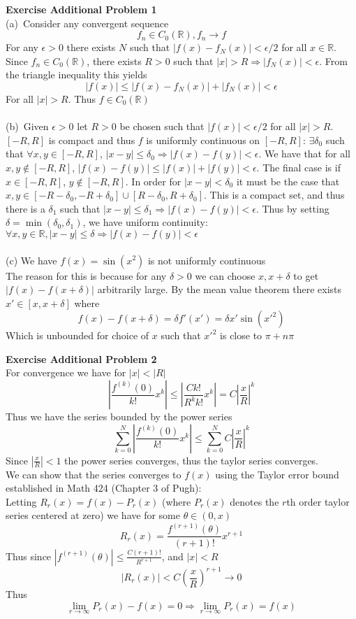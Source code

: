 \documentclass[12pt]{article}
\newenvironment{ques}[1]{\textbf{Exercise #1}\vspace{1 mm}\\ }{\bigskip}
\theoremstyle{definition}
\renewcommand{\l}{\left }
\renewcommand{\r}{\right }
\newcommand{\R}{\mathbb R}
\renewcommand{\t}{\theta}
\begin{document}
\begin{ques}{Additional Problem 1}
	(a)\ Consider any convergent sequence 
	$$f_n \in C_0(\R), f_n \to f$$
	For any $\epsilon > 0$ there exists $N$ such that $|f(x) - f_N(x)| <
	\epsilon / 2$ for all $x \in \R$. Since $f_n \in C_0(\R)$, there exists $R
	> 0$ such that $|x| > R \Rightarrow |f_N(x)| < \epsilon$. From the triangle
	inequality this yields
	$$|f(x)| \leq |f(x) - f_N(x)| + |f_N(x)| < \epsilon$$
	For all $|x| > R$. Thus $f \in C_0(\R)$\\
	\\
	(b)\ Given $\epsilon > 0$ let $R > 0$ be chosen such that $|f(x)| <
	\epsilon/2$ for all $|x| > R$. $[-R, R]$ is compact and thus $f$ is uniformly
	continuous on $[-R,R]$: $\exists \delta_0$ such that $\forall x,y \in
	[-R,R]$, $|x-y| \leq \delta_0 \Rightarrow |f(x) - f(y)| < \epsilon$. We have
	that for all $x,y \notin [-R,R]$, $|f(x) - f(y)| \leq |f(x)| + |f(y)| <
	\epsilon$. The final case is if $x \in [-R,R]$, $y \notin [-R,R]$. In order
	for $|x-y| < \delta_0$ it must be the case that $x,y \in [-R - \delta_0,-R +
	\delta_0] \cup [R - \delta_0,R + \delta_0]$. This is a compact set, and thus
	there is a $\delta_1$ such that $|x-y| \leq \delta_1 \Rightarrow |f(x) - f(y)|
	< \epsilon$. Thus by setting $\delta = \min (\delta_0,\delta_1)$, we have
	uniform continuity: $\forall x,y \in \R, |x - y| \leq \delta \Rightarrow
	|f(x) - f(y)| < \epsilon$\\
	\\
	(c) We have $f(x) = \sin(x^2)$ is not uniformly continuous\\
	The reason for this is because for any $\delta > 0$ we can choose $x, x+
	\delta$ to get $|f(x) - f(x + \delta)|$ arbitrarily large. By the mean
	value theorem there exists $x' \in [x,x+ \delta]$ where
	$$f(x) - f(x + \delta) = \delta f'(x') = \delta x'\sin(x'^2)$$
	Which is unbounded for choice of $x$ such that $x'^2$ is close to $\pi + n\pi$
\end{ques}

\begin{ques}{Additional Problem 2}
	For convergence we have for $|x| < |R|$
	$$ \l|\frac{f^{(k)}(0)}{k!} x^k\r| \leq \l|\frac{Ck!}{R^kk!} x^k\r| = C\l|\frac
	x R\r|^k$$ 
	Thus we have the series bounded by the power series
	$$\sum_{k=0}^N \l|\frac{f^{(k)}(0)}{k!} x^k\r| \leq \sum_{k=0}^N
	C\l|\frac x R\r|^k$$
	Since $\l|\frac x R\r| < 1$ the power series converges, thus the taylor series
	converges. \\
	We can show that the series converges to $f(x)$ using the Taylor error
	bound established in Math 424 (Chapter 3 of Pugh):\\
	Letting $R_r(x) = f(x) - P_r(x)$ (where $P_r(x)$ denotes the $r$th order
	taylor series centered at zero) we have for some $\theta \in (0, x)$
	$$R_r(x) = \frac{f^{(r+1)}(\theta)}{(r+1)!}x^{r+1}$$
	Thus since $|f^{(r+1)}(\t)| \leq \frac{C(r+1)!}{R^{r+1}}$, and $|x| < R$
	$$|R_r(x)| < C\l(\frac{x}{R}\r)^{r+1} \to 0$$
	Thus
	$$\lim_{r \to \infty} P_r(x) - f(x) = 0 \Rightarrow \lim_{r \to \infty}
	P_r(x) = f(x)$$
\end{ques}
\end{document}
